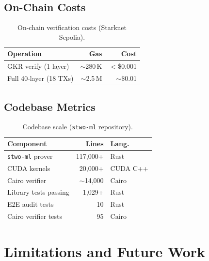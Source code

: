 \documentclass[10pt,twocolumn]{article}
\theoremstyle{definition}
\theoremstyle{remark}
\begin{document}
\subsection{On-Chain Costs}

\begin{table}[t]
  \centering\small
  \caption{On-chain verification costs (Starknet Sepolia).}
  \label{tab:costs}
  \begin{tabular}{@{}lrr@{}}
    \toprule
    \textbf{Operation} & \textbf{Gas} & \textbf{Cost} \\
    \midrule
    GKR verify (1 layer) & $\sim$280\,K & $<$\$0.001 \\
    Full 40-layer (18 TXs) & $\sim$2.5\,M & $\sim$\$0.01 \\
    \bottomrule
  \end{tabular}
\end{table}

\subsection{Codebase Metrics}

\begin{table}[t]
  \centering\small
  \caption{Codebase scale (\texttt{stwo-ml} repository).}
  \label{tab:codebase}
  \begin{tabular}{@{}lrl@{}}
    \toprule
    \textbf{Component} & \textbf{Lines} & \textbf{Lang.} \\
    \midrule
    \texttt{stwo-ml} prover & 117{,}000+ & Rust \\
    CUDA kernels          & 20{,}000+  & CUDA C++ \\
    Cairo verifier        & $\sim$14{,}000 & Cairo \\
    Library tests passing & 1{,}029+   & Rust \\
    E2E audit tests       & 10         & Rust \\
    Cairo verifier tests  & 95         & Cairo \\
    \bottomrule
  \end{tabular}
\end{table}


\section{Limitations and Future Work}\label{sec:limitations}
\end{document}
